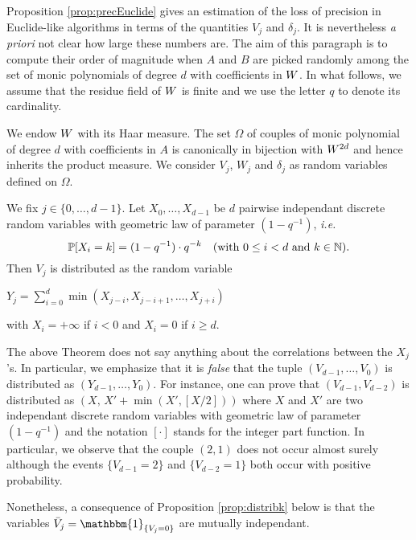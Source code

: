 \documentclass{sig-alternate}
\begin{document}
Proposition \ref{prop:precEuclide} gives an estimation of the loss
of precision in Euclide-like algorithms in terms of the quantities
$V_j$ and $\delta_j$. It is nevertheless \emph{a priori} not clear
how large these numbers are. The aim of this paragraph is to compute
their order of magnitude when $A$ and $B$ are picked randomly among
the set of monic polynomials of degree $d$ with coefficients in $W$.
In what follows, we assume that the residue field of $W$ is finite
and we use the letter $q$ to denote its cardinality.

We endow $W$ with its Haar measure. The set $\Omega$ of couples of 
monic polynomial of degree $d$ with coefficients in $A$ is canonically 
in bijection with $W^{2d}$ and hence inherits the product measure. 
We consider $V_j$, $W_j$ and $\delta_j$ as random variables defined on 
$\Omega$.

\begin{theo}
\label{th:lawVj}
We fix $j \in \{0, \ldots, d-1\}$.
Let $X_0, \ldots, X_{d-1}$ be $d$ pairwise independant discrete random 
variables with geometric law of parameter $(1 - q^{-1})$, \emph{i.e.}
$$\mathbb P[X_i = k] = (1 - q^{-1}) \cdot q^{-k} \quad 
\text{(with } 0 \leq i < d \text{ and } k \in \mathbb N \text{)}.$$
Then $V_j$ is distributed as the random variable
\begin{center}
$\displaystyle Y_j = \sum_{i=0}^d \min(X_{j-i}, X_{j-i+1}, \ldots, X_{j+i})$
\end{center}
\noindent
with $X_i = +\infty$ if $i < 0$ and $X_i = 0$ if $i \geq d$.
\end{theo}

\begin{rem}
The above Theorem does not say anything about the correlations between
the $X_j$'s. In particular, we emphasize that it is \emph{false} that
the tuple $(V_{d-1}, \ldots, V_0)$ is distributed as $(Y_{d-1}, \ldots,
Y_0)$. For instance, one can prove that $(V_{d-1}, 
V_{d-2})$ is distributed as 
$(X, \, X' + \min(X', [X/2]))$
where $X$ and $X'$ are two independant discrete random variables with 
geometric law of parameter $(1 - q^{-1})$ and the notation $[\cdot]$ 
stands for the integer part function. In particular, we observe that 
the couple $(2,1)$ does not occur almost surely although the events 
$\{V_{d-1} = 2\}$ and $\{V_{d-2} = 1\}$ both occur with positive 
probability.

Nonetheless, a consequence of Proposition \ref{prop:distribk} below is 
that the variables $\bar V_j = \mathbbm{1}_{\{V_j = 0\}}$ are mutually 
independant.
\end{rem}
\end{document}
